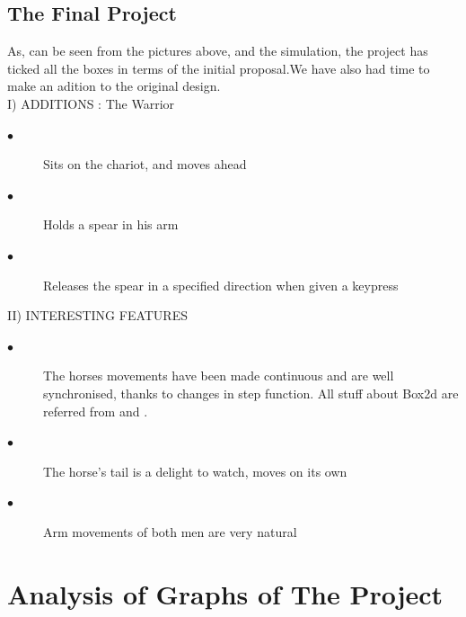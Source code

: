 \documentclass[11pt]{article}
\begin{document}
	\subsection*{The Final Project}
		As, can be seen from the pictures above, and the simulation, the project has ticked all the boxes in terms of the initial 			proposal.We have also had time to make an adition to the original design.
		\\I) ADDITIONS : The Warrior
	\begin{description}
		\item[$\bullet$ ] Sits on the chariot, and moves ahead
		\item[$\bullet$ ] Holds a spear in his arm
		\item[$\bullet$ ] Releases the spear in a specified direction when given a keypress
	\end{description}
	
	II) INTERESTING FEATURES
	\begin{description}
		\item[$\bullet$ ] The horses movements have been made continuous and are well synchronised, thanks to changes in step function.
		All stuff about Box2d are referred from \cite{box2d} and \cite{box}.
		\item[$\bullet$ ] The horse's tail is a delight to watch, moves on its own
		\item[$\bullet$ ] Arm movements of both men are very natural
	\end{description}
	\section*{Analysis of Graphs of The Project}
\end{document}
